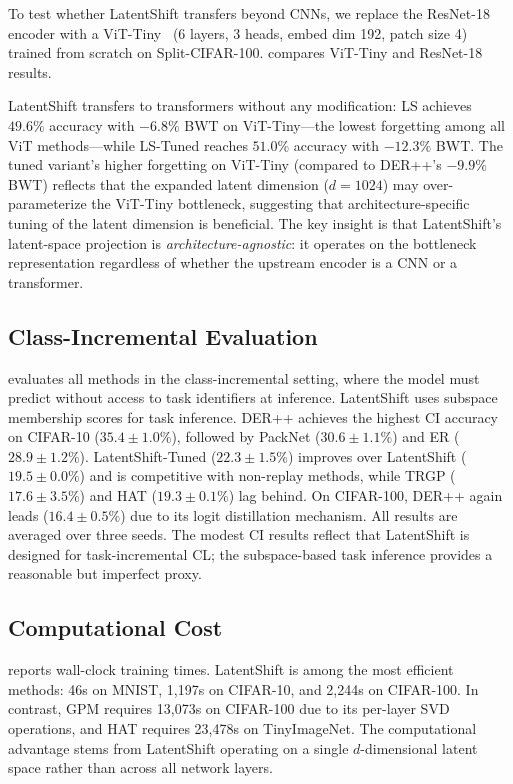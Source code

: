 \documentclass{article}
\begin{document}
To test whether LatentShift transfers beyond CNNs, we replace the ResNet-18
encoder with a ViT-Tiny~\citep{dosovitskiy2021image} (6 layers, 3 heads,
embed dim 192, patch size 4) trained from scratch on Split-CIFAR-100.
 compares ViT-Tiny and ResNet-18 results.

LatentShift transfers to transformers without any modification: LS achieves
$49.6\%$ accuracy with $-6.8\%$ BWT on ViT-Tiny---the lowest forgetting
among all ViT methods---while LS-Tuned reaches $51.0\%$ accuracy with
$-12.3\%$ BWT. The tuned variant's higher forgetting on ViT-Tiny (compared to
DER++'s $-9.9\%$ BWT) reflects that the expanded latent dimension ($d=1024$)
may over-parameterize the ViT-Tiny bottleneck, suggesting that
architecture-specific tuning of the latent dimension is beneficial.
The key insight is that LatentShift's latent-space projection is
\emph{architecture-agnostic}: it operates on the bottleneck representation
regardless of whether the upstream encoder is a CNN or a transformer.



\subsection{Class-Incremental Evaluation}

 evaluates all methods in the class-incremental setting, where
the model must predict without access to task identifiers at inference.
LatentShift uses subspace membership scores for task inference.
DER++ achieves the highest CI accuracy on CIFAR-10 ($35.4 \pm 1.0\%$), followed by
PackNet ($30.6 \pm 1.1\%$) and ER ($28.9 \pm 1.2\%$). LatentShift-Tuned ($22.3 \pm 1.5\%$) improves
over LatentShift ($19.5 \pm 0.0\%$) and is competitive with non-replay methods, while
TRGP ($17.6 \pm 3.5\%$) and HAT ($19.3 \pm 0.1\%$) lag behind. On CIFAR-100, DER++ again
leads ($16.4 \pm 0.5\%$) due to its logit distillation mechanism. All results are
averaged over three seeds. The modest CI results reflect that LatentShift is
designed for task-incremental CL; the subspace-based task inference provides a
reasonable but imperfect proxy.



\subsection{Computational Cost}

 reports wall-clock training times. LatentShift is among the
most efficient methods: 46s on MNIST, 1,197s on CIFAR-10, and 2,244s on
CIFAR-100. In contrast, GPM requires 13,073s on CIFAR-100 due to its
per-layer SVD operations, and HAT requires 23,478s on TinyImageNet. The
computational advantage stems from LatentShift operating on a single
$d$-dimensional latent space rather than across all network layers.
\end{document}
